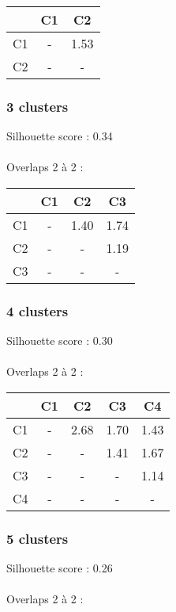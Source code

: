 \documentclass{article}
\begin{document}
\begin{tabular}{|c|c|c|}
\hline
& C1 & C2 \\
\hline
C1 & - & 1.53 \\
\hline
C2 & - & - \\
\hline
\end{tabular}

\subsubsection*{3 clusters}

Silhouette score : 0.34 \\\\
Overlaps 2 à 2 :\\

\begin{tabular}{|c|c|c|c|}
\hline
& C1 & C2 & C3 \\
\hline
C1 & - & 1.40 & 1.74 \\
\hline
C2 & - & - & 1.19 \\
\hline
C3 & - & - & - \\
\hline
\end{tabular}

\subsubsection*{4 clusters}

Silhouette score : 0.30 \\\\
Overlaps 2 à 2 :\\

\begin{tabular}{|c|c|c|c|c|}
\hline
& C1 & C2 & C3 & C4 \\
\hline
C1 & - & 2.68 & 1.70 & 1.43 \\
\hline
C2 & - & - & 1.41 & 1.67 \\
\hline
C3 & - & - & - & 1.14 \\
\hline
C4 & - & - & - & - \\
\hline
\end{tabular}

\subsubsection*{5 clusters}

Silhouette score : 0.26 \\\\
Overlaps 2 à 2 :\\
\end{document}
